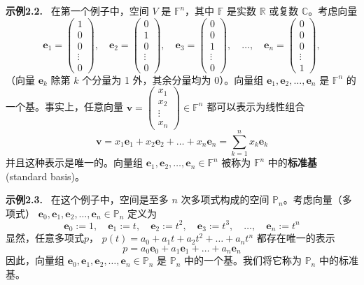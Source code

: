 \textbf{示例2.2.}~ 
在第一个例子中，空间 ${V}$ 是 $\mathbb{F}^n$，其中 $\mathbb{F}$ 是实数 $\mathbb{R}$ 或复数 $\mathbb{C}$。考虑向量
$$ \mathbf{e}_1 = \begin{pmatrix} 1 \\ 0 \\ 0 \\ \vdots \\ 0 \end{pmatrix}, \quad \mathbf{e}_2 = \begin{pmatrix} 0 \\ 1 \\ 0 \\ \vdots \\ 0 \end{pmatrix}, \quad \mathbf{e}_3 = \begin{pmatrix} 0 \\ 0 \\ 1 \\ \vdots \\ 0 \end{pmatrix}, \quad \dots, \quad \mathbf{e}_n = \begin{pmatrix} 0 \\ 0 \\ 0 \\ \vdots \\ 1 \end{pmatrix} ,$$
（向量 $\mathbf{e}_k$ 除第 $k$ 个分量为 1 外，其余分量均为 0）。向量组 $\mathbf{e}_1, \mathbf{e}_2, \dots, \mathbf{e}_n$ 是 $\mathbb{F}^n$ 的一个基。事实上，任意向量 $\mathbf{v} = \begin{pmatrix} x_1 \\ x_2 \\ \vdots \\ x_n \end{pmatrix} \in \mathbb{F}^n$ 都可以表示为线性组合
$$ \mathbf{v} = x_1 \mathbf{e}_1 + x_2 \mathbf{e}_2 + \dots + x_n \mathbf{e}_n = \sum_{k=1}^n x_k \mathbf{e}_k $$
并且这种表示是唯一的。向量组 $\mathbf{e}_1, \mathbf{e}_2, \dots, \mathbf{e}_n \in \mathbb{F}^n$ 被称为 $\mathbb{F}^n$ 中的\textbf{标准基}(standard basis)。


\textbf{示例2.3.}~ 
在这个例子中，空间是至多 $n$ 次多项式构成的空间 $\mathbb{P}_n$。考虑向量（多项式） $\mathbf{e}_0, \mathbf{e}_1, \mathbf{e}_2, \dots, \mathbf{e}_n \in \mathbb{P}_n$ 定义为
$$ \mathbf{e}_0 := 1, \quad \mathbf{e}_1 := t, \quad \mathbf{e}_2 := t^2, \quad \mathbf{e}_3 := t^3, \quad \dots, \quad \mathbf{e}_n := t^n $$
显然，任意多项式$p$， $p(t) = a_0 + a_1 t + a_2 t^2 + \dots + a_n t^n$ 都存在唯一的表示
$$ p = a_0 \mathbf{e}_0 + a_1 \mathbf{e}_1 + \dots + a_n \mathbf{e}_n $$
因此，向量组 $\mathbf{e}_0, \mathbf{e}_1, \mathbf{e}_2, \dots, \mathbf{e}_n \in \mathbb{P}_n$ 是 $\mathbb{P}_n$ 中的一个基。我们将它称为 $\mathbb{P}_n$ 中的标准基。

